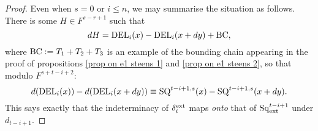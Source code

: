 \documentclass[11pt]{amsart} \renewcommand{\baselinestretch}{1.4}
\theoremstyle{plain}
\newtheorem{cor}[thm]{Corollary}
\theoremstyle{definition}
\newcommand{\Sq}{\mathrm{Sq}}
\newcommand{\E}[5]{[E^{#1}_{#2}#3]^{#4}_{#5}}
\begin{document}
\begin{second quadrant homotopy sseq operations}
\begin{proof}
Even when $s=0$ or $i\leq n$, we may summarise the situation as follows. There is some $H\in F^{s-r+1}$ such that
\[
dH
=
\textup{DEL}_i(x)-\textup{DEL}_i(x+dy)+\textup{BC},%
\]
where $\textup{BC}:=T_1+T_2+T_3$ is an example of the bounding chain appearing in the proof of propositions \ref{prop on e1 steens 1} and \ref{prop on e1 steens 2}, so that
modulo $F^{s+t-i+2}$:
\[d(\textup{DEL}_i(x))-d(\textup{DEL}_i(x+dy))
\equiv
\textup{SQ}^{t-i+1,s}(x)-\textup{SQ}^{t-i+1,s}(x+dy).\]
%
This says exactly that the indeterminacy of $\delta_i^\textup{ext}$ maps \emph{onto} that of $\Sq_\textup{ext}^{t-i+1}$ under $d_{t-i+1}$.
\end{proof}
%
%


\end{second quadrant homotopy sseq operations}
\end{document}
